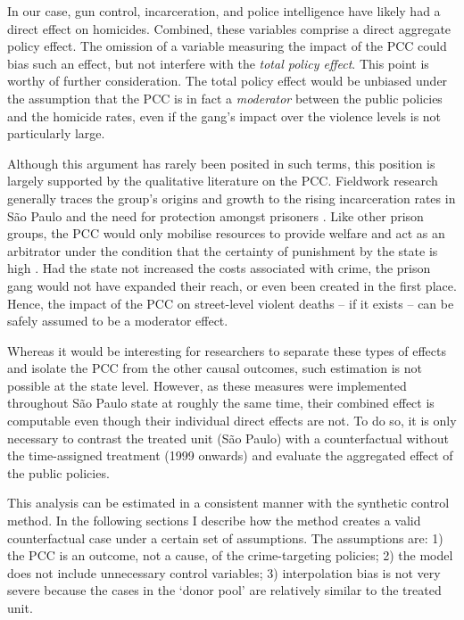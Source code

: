 In our case, gun control, incarceration, and police intelligence have likely had a direct effect on homicides. Combined, these variables comprise a direct aggregate policy effect. The omission of a variable measuring the impact of the PCC could bias such an effect, but not interfere with the \emph{total policy effect}. This point is worthy of further consideration. The total policy effect would be unbiased under the assumption that the PCC is in fact a \emph{moderator} between the public policies and the homicide rates, even if the gang's impact over the violence levels is not particularly large. 

Although this argument has rarely been posited in such terms, this position is largely supported by the qualitative literature on the PCC. Fieldwork research generally traces the group's origins and growth to the rising incarceration rates in São Paulo and the need for protection amongst prisoners \citep{dias2011pulverizaccao, manso2014}. Like other prison groups, the PCC would only mobilise resources to provide welfare and act as an arbitrator under the condition that the certainty of punishment by the state is high \citep{skarbek2011, freire2014}. Had the state not increased the costs associated with crime, the prison gang would not have expanded their reach, or even been created in the first place. Hence, the impact of the PCC on street-level violent deaths -- if it exists -- can be safely assumed to be a moderator effect. 

Whereas it would be interesting for researchers to separate these types of effects and isolate the PCC from the other causal outcomes, such estimation is not possible at the state level. However, as these measures were implemented throughout São Paulo state at roughly the same time, their combined effect is computable even though their individual direct effects are not. To do so, it is only necessary to contrast the treated unit (São Paulo) with a counterfactual without the time-assigned treatment (1999 onwards) and evaluate the aggregated effect of the public policies.

This analysis can be estimated in a consistent manner with the synthetic control method. In the following sections I describe how the method creates a valid counterfactual case under a certain set of assumptions. The assumptions are: 1) the PCC is an outcome, not a cause, of the crime-targeting policies; 2) the model does not include unnecessary control variables; 3) interpolation bias is not very severe because the cases in the `donor pool' are relatively similar to the treated unit. 

